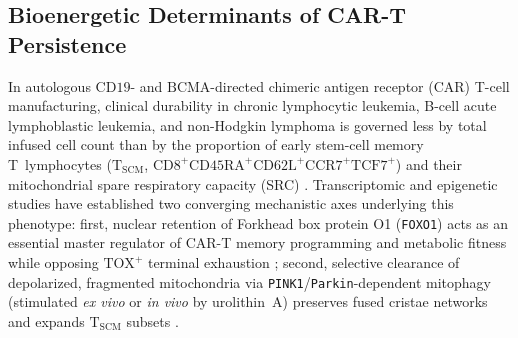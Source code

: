 \documentclass[11pt]{article}
\theoremstyle{plain}
\theoremstyle{remark}
\begin{document}
\subsection{Bioenergetic Determinants of CAR-T Persistence}
In autologous $\text{CD19}$- and $\text{BCMA}$-directed chimeric antigen receptor (CAR) T-cell manufacturing, clinical durability in chronic lymphocytic leukemia, B-cell acute lymphoblastic leukemia, and non-Hodgkin lymphoma is governed less by total infused cell count than by the proportion of early stem-cell memory T~lymphocytes ($\mathrm{T}_{\mathrm{SCM}}$, $\text{CD8}^+\text{CD45RA}^+\text{CD62L}^+\text{CCR7}^+\text{TCF7}^+$) and their mitochondrial spare respiratory capacity (SRC) \cite{fraietta2018determinants,buck2016mitochondrial}. Transcriptomic and epigenetic studies have established two converging mechanistic axes underlying this phenotype: first, nuclear retention of Forkhead box protein O1 (\texttt{FOXO1}) acts as an essential master regulator of CAR-T memory programming and metabolic fitness while opposing $\text{TOX}^+$ terminal exhaustion \cite{doan2024foxo1,chan2024foxo1,pauken2016epigenetic}; second, selective clearance of depolarized, fragmented mitochondria via \texttt{PINK1}/\texttt{Parkin}-dependent mitophagy (stimulated \textit{ex vivo} or \textit{in vivo} by urolithin~A) preserves fused cristae networks and expands $\mathrm{T}_{\mathrm{SCM}}$ subsets \cite{ryu2016urolithin,denk2022immunity,denk2025mitoimmune}.
\end{document}
